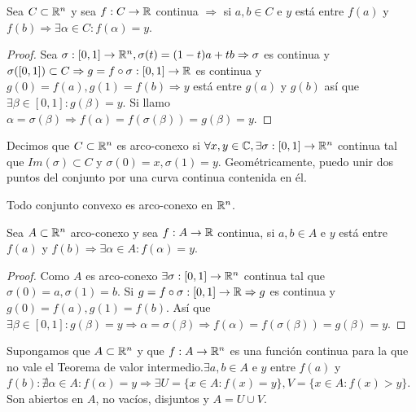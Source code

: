 \begin{prop}
  Sea \(C \subset \mathbb{R}^n\) y sea \(f : C \to \mathbb{R} \) continua \(\Rightarrow \) si \(a, b \in C\) e \(y\) está entre \(f(a)\) y \(f(b) \Rightarrow \exists \alpha \in C : f(\alpha) = y\).
  \begin{proof}
    Sea \(\sigma: [0, 1] \to \mathbb{R}^n, \sigma(t) = (1-t)a+tb \Rightarrow \sigma \) es continua y \(\sigma([0, 1]) \subset C \Rightarrow g = f \circ \sigma: [0, 1] \to \mathbb{R} \) es continua y \(g(0) = f(a), g(1) = f(b) \Rightarrow y\) está entre \(g(a)\) y \(g(b)\) así que \(\exists \beta \in [0, 1] : g(\beta) = y\). Si llamo \(\alpha = \sigma(\beta) \Rightarrow f(\alpha) = f(\sigma(\beta)) = g(\beta) = y\).
  \end{proof}
\end{prop}

\begin{definition}
  Decimos que \(C \subset \mathbb{R}^n\) es arco-conexo si \(\forall x, y \in \mathbb{C}, \exists \sigma: [0, 1] \to \mathbb{R}^n\) continua tal que \(Im(\sigma) \subset C\) y \(\sigma(0) = x, \sigma(1) = y\). Geométricamente, puedo unir dos puntos del conjunto por una curva continua contenida en él.
\end{definition}

\begin{note}
  Todo conjunto convexo es arco-conexo en \(\mathbb{R}^n\).
\end{note}

\begin{prop}
  Sea \(A \subset \mathbb{R}^n\) arco-conexo y sea \(f: A \to \mathbb{R} \) continua, si \(a, b \in A\) e \(y\) está entre \(f(a)\) y \(f(b) \Rightarrow \exists \alpha \in A : f(\alpha) = y\).
  \begin{proof}
    Como \(A\) es arco-conexo \(\exists \sigma: [0, 1] \to \mathbb{R}^n\) continua tal que \(\sigma(0) = a, \sigma(1) = b\). Si \(g = f \circ \sigma: [0, 1] \to \mathbb{R} \Rightarrow g\) es continua y \(g(0) = f(a), g(1) = f(b)\). Así que \(\exists \beta \in [0, 1] : g(\beta) = y \Rightarrow \alpha = \sigma(\beta) \Rightarrow f(\alpha) = f(\sigma(\beta)) = g(\beta) = y\).
  \end{proof}
\end{prop}

\begin{note}
  Supongamos que \(A \subset \mathbb{R}^n\) y que \(f: A \to \mathbb{R}^n\) es una función continua para la que no vale el Teorema de valor intermedio.\(\exists a, b \in A\) e \(y\) entre \(f(a)\) y \(f(b) : \nexists \alpha \in A : f(\alpha) = y \Rightarrow \exists U = \{ x \in A : f(x) = y \}, V = \{ x \in A : f(x) > y \} \). Son abiertos en \(A\), no vacíos, disjuntos y \(A = U \cup V\).
\end{note}

